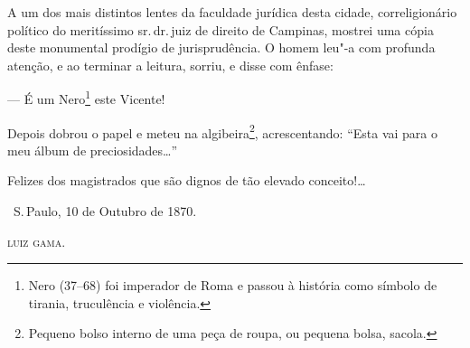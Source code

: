 A um dos mais distintos lentes da faculdade jurídica desta cidade,
correligionário político do meritíssimo sr.\,dr.\,juiz de direito de
Campinas, mostrei uma cópia deste monumental prodígio de jurisprudência.
O homem leu"-a com profunda atenção, e ao terminar a leitura, sorriu, e
disse com ênfase:

--- É um Nero\footnote{Nero (37--68) foi imperador de Roma e passou à
  história como símbolo de tirania, truculência e violência.} este
Vicente!

Depois dobrou o papel e meteu na algibeira\footnote{Pequeno bolso
  interno de uma peça de roupa, ou pequena bolsa, sacola.},
acrescentando: ``Esta vai
para o meu álbum de preciosidades\ldots{}''

Felizes dos magistrados que são dignos de tão elevado conceito!\ldots{}

\bigskip

\hfill\ S.\,Paulo, 10 de Outubro de 1870.\smallskip

\hfill\textsc{luiz gama.}

\paginabranca
\mbox{}\vfill
\thispagestyle{empty}

